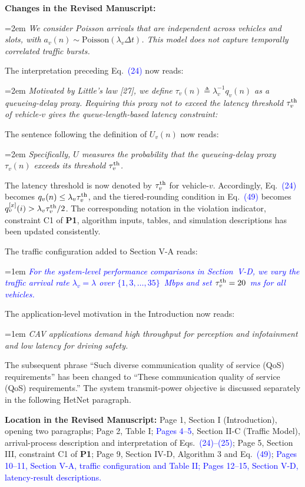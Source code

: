 \documentclass[11pt]{article}
\newenvironment{reviewedit}[1]
{\colorlet{responseblue}{#1}\colorlet{changeblue}{#1}\color{#1}}
{}
\newenvironment{manuscriptchanges}
{\par\noindent\textcolor{changeblue}{\textbf{Changes in the Revised Manuscript:}}\par\color{changeblue}}
{\par}
\newcommand{\revisionlocation}[1]{%
  \par\noindent\textbf{Location in the Revised Manuscript:} #1\par
}
\begin{document}
\begin{reviewedit}{blue}
\begin{manuscriptchanges}
{\emergencystretch=2em
\emph{We consider Poisson arrivals that are independent across vehicles and slots, with $a_v(n)\sim\mathrm{Poisson} (\lambda_v\Delta t)$. This model does not capture temporally correlated traffic bursts.}\par}

The interpretation preceding Eq.~\textcolor{blue}{(24)} now reads:

{\emergencystretch=2em
\emph{Motivated by Little's law [27], we define $\tau_v(n)\triangleq\lambda_v^{-1}q_v(n)$ as a queueing-delay proxy. Requiring this proxy not to exceed the latency threshold $\tau_v^{\rm th}$ of  vehicle-$v$  gives the queue-length-based latency constraint:}\par}

The sentence following the definition of $U_v(n)$ now reads:

{\emergencystretch=2em
\emph{Specifically, $U$ measures the probability that the queueing-delay proxy $\tau_v(n)$ exceeds its threshold $\tau_v^{\rm th}$.}\par}

The latency threshold is now denoted by $\tau_v^{\rm th}$ for vehicle-$v$.
Accordingly, Eq.~\textcolor{blue}{(24)} becomes $q_v(n)\leq\lambda_v\tau_v^{\rm th}$, and the
tiered-rounding condition in Eq.~\textcolor{blue}{(49)} becomes
$q_v^{[x]}(i)>\lambda_v\tau_v^{\rm th}/2$.
The corresponding notation in the violation indicator, constraint C1 of
\textbf{P1}, algorithm inputs, tables, and simulation descriptions has been
updated consistently.

The traffic configuration added to Section V-A reads:

{\emergencystretch=1em
\textcolor{blue}{\emph{For the system-level performance comparisons in Section~V-D, we vary the traffic arrival rate $\lambda_v=\lambda$ over $\{1,3,\ldots,35\}$~Mbps and set $\tau_v^{\rm th}=20$~ms for all vehicles.}}\par}

The application-level motivation in the Introduction now reads:

{\emergencystretch=1em
\emph{CAV applications demand high throughput for perception and infotainment and low latency for driving safety.}\par}
The subsequent phrase ``Such diverse communication quality of service (QoS)
requirements'' has been changed to ``These communication quality of service (QoS)
requirements.'' The system transmit-power objective is discussed separately in
the following HetNet paragraph.
\end{manuscriptchanges}
\revisionlocation{Page 1, Section I (Introduction), opening two paragraphs;
Page 2, Table I;
\textcolor{blue}{Pages 4--5}, Section II-C (Traffic Model), arrival-process description and interpretation of Eqs.~\textcolor{blue}{(24)--(25)};
Page 5, Section III, constraint C1 of \textbf{P1};
Page 9, Section IV-D, Algorithm 3 and Eq.~\textcolor{blue}{(49)};
\textcolor{blue}{Pages 10--11, Section V-A, traffic configuration and Table II;
Pages \textcolor{blue}{12--15}, Section V-D, latency-result descriptions.}}
\end{reviewedit}
\end{document}
